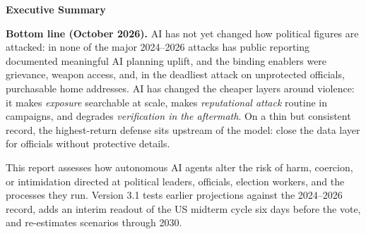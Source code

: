 \documentclass[11pt,letterpaper]{article}
\begin{document}
\begin{titlepage}
\end{titlepage}

\thispagestyle{empty}
\vspace*{0.5cm}

\noindent{}

\vspace{0.5cm}
\begin{center}
{\color{instdark}\Large\bfseries Executive Summary}
\end{center}
\vspace{0.3cm}

\begin{tcolorbox}[enhanced, colback=lightgray, colframe=instblue!50, boxrule=1pt, arc=3pt,
  left=10pt, right=10pt, top=8pt, bottom=8pt]
\textbf{Bottom line (October 2026).} AI has not yet changed how political figures are attacked: in none of the major 2024--2026 attacks has public reporting documented meaningful AI planning uplift, and the binding enablers were grievance, weapon access, and, in the deadliest attack on unprotected officials, purchasable home addresses. AI has changed the cheaper layers around violence: it makes \textit{exposure} searchable at scale, makes \textit{reputational attack} routine in campaigns, and degrades \textit{verification in the aftermath}. On a thin but consistent record, the highest-return defense sits upstream of the model: close the data layer for officials without protective details.

\smallskip
{\small This report assesses how autonomous AI agents alter the risk of harm, coercion, or intimidation directed at political leaders, officials, election workers, and the processes they run. Version 3.1 tests earlier projections against the 2024--2026 record, adds an interim readout of the US midterm cycle six days before the vote, and re-estimates scenarios through 2030.}
\end{tcolorbox}
\end{document}
